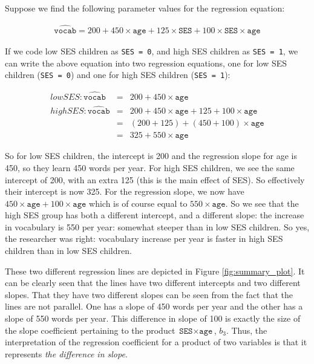 % 
% 

Suppose we find the following parameter values for the regression equation:

\begin{eqnarray}
\widehat{\texttt{vocab}} = 200 + 450 \times \texttt{age} + 125 \times \texttt{SES} + 100 \times \texttt{SES}  \times \texttt{age} \label{eq:vocab}
\end{eqnarray}

If we code low SES children as \texttt{SES = 0}, and high SES children as \texttt{SES = 1}, we can write the above equation into two regression equations, one for low SES children (\texttt{SES = 0}) and one for high SES children (\texttt{SES = 1}):

\begin{eqnarray}
low SES: \widehat{\texttt{vocab}} &=&  200 + 450 \times \texttt{age}   \\
high SES: \widehat{\texttt{vocab}} &=& 200 + 450 \times \texttt{age} + 125  + 100   \times \texttt{age}\\
&=& (200 + 125) + (450 + 100) \times \texttt{age} \nonumber\\
&=& 325 + 550 \times \texttt{age} \nonumber
\end{eqnarray}

So for low SES children, the intercept is 200 and the regression slope for age is 450, so they learn 450 words per year. For high SES children, we see the same intercept of 200, with an extra 125 (this is the main effect of SES). So effectively their intercept is now 325. For the regression slope, we now have $450 \times \texttt{age}+ 100   \times \texttt{age}$ which is of course equal to $550 \times \texttt{age}$. So we see that the high SES group has both a different intercept, and a different slope: the increase in vocabulary is 550 per year: somewhat steeper than in low SES children. So yes, the researcher was right: vocabulary increase per year is faster in high SES children than in low SES children.

These two different regression lines are depicted in Figure \ref{fig:summary_plot}. It can be clearly seen that the lines have two different intercepts and two different slopes. That they have two different slopes can be seen from the fact that the lines are not parallel. One has a slope of 450 words per year and the other has a slope of 550 words per year. This difference in slope of 100 is exactly the size of the slope coefficient pertaining to the product $\texttt{SES} \times \texttt{age}$, $b_3$. Thus, the interpretation of the regression coefficient for a product of two variables is that it represents \textit{the difference in slope}.

